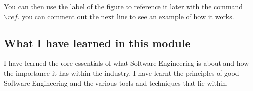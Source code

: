 You can then use the label of the figure to reference it later with the command ${\backslash}ref.$ you can comment out the next line to see an example of how it works.


\subsection{What I have learned in this module}
 
I have learned the core essentials of what Software Engineering is about and how the importance it has within the industry. I have learnt the principles of good Software Engineering and the various tools and techniques that lie within. 
